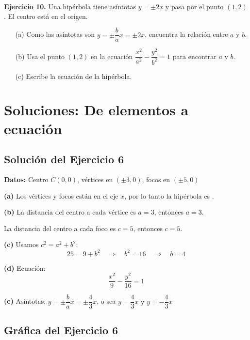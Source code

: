 \documentclass[12pt,a4paper]{article}
\begin{document}
	\bigskip

	\textbf{Ejercicio 10.} Una hipérbola tiene asíntotas $y=\pm 2x$ y pasa por el punto $(1,2)$. El centro está en el origen.
	\begin{itemize}
		\item[(a)] Como las asíntotas son $y=\pm\dfrac{b}{a}x=\pm 2x$, encuentra la relación entre $a$ y $b$.
		\item[(b)] Usa el punto $(1,2)$ en la ecuación $\dfrac{x^2}{a^2}-\dfrac{y^2}{b^2}=1$ para encontrar $a$ y $b$.
		\item[(c)] Escribe la ecuación de la hipérbola.
	\end{itemize}

	\section{Soluciones: De elementos a ecuación}

	\subsection*{Solución del Ejercicio 6}

	\textbf{Datos:} Centro $C(0,0)$, vértices en $(\pm 3,0)$, focos en $(\pm 5,0)$

	\bigskip

	\textbf{(a)} Los vértices y focos están en el eje $x$, por lo tanto la hipérbola es .

	\textbf{(b)} La distancia del centro a cada vértice es $a=3$, entonces $\boxed{a=3}$.

	La distancia del centro a cada foco es $c=5$, entonces $\boxed{c=5}$.

	\textbf{(c)} Usamos $c^2=a^2+b^2$:
	\[
	25=9+b^2 \quad\Rightarrow\quad b^2=16 \quad\Rightarrow\quad \boxed{b=4}
	\]

	\textbf{(d)} Ecuación:
	\[
	\boxed{\frac{x^2}{9}-\frac{y^2}{16}=1}
	\]

	\textbf{(e)} Asíntotas: $y=\pm\dfrac{b}{a}x=\pm\dfrac{4}{3}x$, o sea $\boxed{y=\dfrac{4}{3}x\text{ y }y=-\dfrac{4}{3}x}$

	\subsection*{Gráfica del Ejercicio 6}
\end{document}
